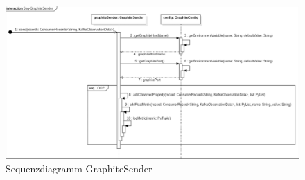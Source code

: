\begin{figure}[!hbp]
	\centering
	\includegraphics[width=\linewidth]{images/graphite/GraphiteSenderSequenceDiagram.png}
	\caption{Sequenzdiagramm GraphiteSender}
\end{figure}
\newpage

